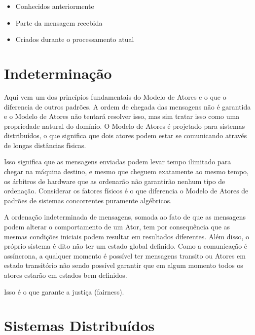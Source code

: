 \begin{itemize}
    \item Conhecidos anteriormente
    \item Parte da mensagem recebida
    \item Criados durante o processamento atual
\end{itemize}

\section{Indeterminação}

Aqui vem um dos princípios fundamentais do Modelo de Atores e o que o diferencia de outros padrões. A ordem de chegada das mensagens não é garantida e o Modelo de Atores não tentará resolver isso, mas sim tratar isso como uma propriedade natural do domínio. O Modelo de Atores é projetado para sistemas distribuídos, o que significa que dois atores podem estar se comunicando através de longas distâncias físicas.

Isso significa que as mensagens enviadas podem levar tempo ilimitado para chegar na máquina destino, e mesmo que cheguem exatamente ao mesmo tempo, os árbitros de hardware que as ordenarão não garantirão nenhum tipo de ordenação. Considerar os fatores físicos é o que diferencia o Modelo de Atores de padrões de sistemas concorrentes puramente algébricos.

A ordenação indeterminada de mensagens, somada ao fato de que as mensagens podem alterar o comportamento de um Ator, tem por consequência que as mesmas condições iniciais podem resultar em resultados diferentes. Além disso, o próprio sistema é dito não ter um estado global definido. Como a comunicação é assíncrona, a qualquer momento é possível ter mensagens transito ou Atores em estado transitório não sendo possível garantir que em algum momento todos os atores estarão em estados bem definidos.

Isso é o que garante a justiça (fairness).

\section{Sistemas Distribuídos}


